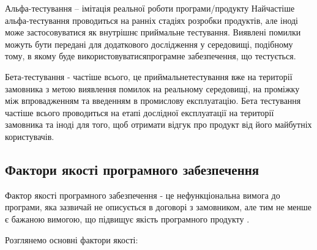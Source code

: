 Альфа-тестування – імітація реальної роботи програми/продукту
Найчастіше альфа-тестування проводиться на ранніх стадіях
розробки продуктів, але іноді може застосовуватися як внутрішнє
приймальне тестування. Виявлені помилки можуть бути
передані для додаткового дослідження у середовищі, подібному
тому, в якому буде використовуватисяпрограмне забезпечення, що тестується.

Бета-тестування - частіше всього, це приймальнетестування
вже на території замовника з метою виявлення помилок
на реальному середовищі, на проміжку між впровадженням
та введенням в промислову експлуатацію. Бета тестування
частіше всього проводиться на етапі дослідної експлуатації
на території замовника та іноді для того, щоб отримати
відгук про продукт від його майбутніх користувачів.

\clearpage
\subsection{Фактори якості програмного забезпечення}

Фактор якості програмного забезпечення - це нефункціональна
вимога до програми, яка зазвичай не описується в договорі
з замовником, але тим не менше є бажаною вимогою, що підвищує
якість програмного продукту \cite{os-development,testing-black,test-automation-article}.

Розглянемо основні фактори якості:

